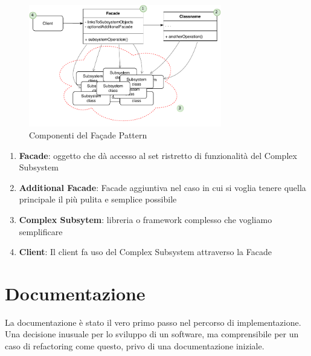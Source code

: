\begin{figure}[H]
    \centering
    \includegraphics[width=0.75\textwidth]{images/03_1_facade_pattern.pdf}
    \caption{Componenti del Façade Pattern}
    \label{fig:facadepattern}
\end{figure}

\begin{enumerate}
    \item \textbf{Facade}: oggetto che dà accesso al set ristretto di funzionalità del Complex Subsystem
    \item \textbf{Additional Facade}: Facade aggiuntiva nel caso in cui si voglia tenere quella principale il più pulita e semplice possibile
    \item \textbf{Complex Subsytem}: libreria o framework complesso che vogliamo semplificare
    \item \textbf{Client}: Il client fa uso del Complex Subsystem attraverso la Facade
\end{enumerate}

\section{Documentazione}
La documentazione è stato il vero primo passo nel percorso di implementazione. Una decisione inusuale per lo sviluppo di un software, ma comprensibile per un caso di refactoring come questo, privo di una documentazione iniziale. 


